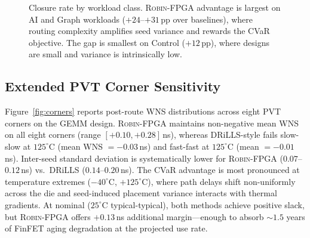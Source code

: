 \documentclass[journal,onecolumn=false]{IEEEtran}
\begin{document}
\begin{figure}[t]
\centering
{}
\caption{Closure rate by workload class. \textsc{Robin-FPGA} advantage is largest on AI and Graph workloads ($+24$--$+31$\,pp over baselines), where routing complexity amplifies seed variance and rewards the CVaR objective. The gap is smallest on Control ($+12$\,pp), where designs are small and variance is intrinsically low.}
\label{fig:class}
\end{figure}

\subsection{Extended PVT Corner Sensitivity}
\label{sec:corners}

Figure~\ref{fig:corners} reports post-route WNS distributions across eight PVT corners on the GEMM design. \textsc{Robin-FPGA} maintains non-negative mean WNS on all eight corners (range $[+0.10, +0.28]$\,ns), whereas DRiLLS-style fails slow-slow at $125^\circ$C (mean WNS $= -0.03$\,ns) and fast-fast at $125^\circ$C (mean $= -0.01$\,ns). Inter-seed standard deviation is systematically lower for \textsc{Robin-FPGA} ($0.07$--$0.12$\,ns) vs.\ DRiLLS ($0.14$--$0.20$\,ns). The CVaR advantage is most pronounced at temperature extremes ($-40^\circ$C, $+125^\circ$C), where path delays shift non-uniformly across the die and seed-induced placement variance interacts with thermal gradients. At nominal ($25^\circ$C typical-typical), both methods achieve positive slack, but \textsc{Robin-FPGA} offers $+0.13$\,ns additional margin—enough to absorb ${\sim}1.5$ years of FinFET aging degradation at the projected use rate.
\end{document}
